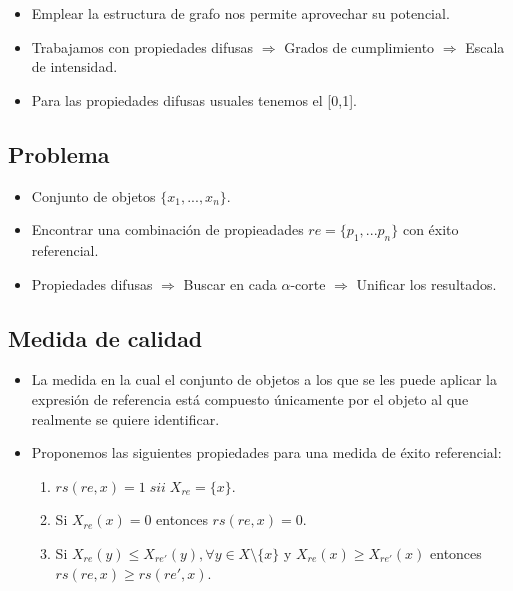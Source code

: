 \documentclass{beamer}
\begin{document}
	\begin{frame}
		\begin{itemize}
			\item Emplear la estructura de grafo nos permite aprovechar su potencial.
			\item Trabajamos con propiedades difusas $\Rightarrow$ Grados de cumplimiento $\Rightarrow$ Escala de intensidad.
			\item Para las propiedades difusas usuales tenemos el [0,1].
		\end{itemize}
	\end{frame}
	
	\subsection{Problema}
	
	\begin{frame}
		\begin{itemize}
			\item Conjunto de objetos $\lbrace x_1, ..., x_n\rbrace$.
			\item Encontrar una combinación de propieadades $re = \lbrace p_1, ... p_n \rbrace$ con éxito referencial.
			\item Propiedades difusas $\Rightarrow$ Buscar en cada $\alpha$-corte $\Rightarrow$ Unificar los resultados.
		\end{itemize}
	\end{frame}
	
	\subsection{Medida de calidad}
	
	\begin{frame}
		\begin{itemize}
			\item La medida en la cual el conjunto de objetos a los que se les puede aplicar la expresión de referencia está compuesto únicamente por el objeto al que realmente se quiere identificar.
			\item Proponemos las siguientes propiedades para una medida de éxito referencial:
				\begin{enumerate}
					\item $rs(re, x) = 1 \; sii \; X_{re} = \lbrace x \rbrace$.
					\item Si $X_{re}(x) = 0$ entonces $rs(re, x) = 0$.
					\item Si $X_{re}(y) \leq X_{re'}(y), \forall y \in X\setminus\lbrace x\rbrace$ y $X_{re}(x) \geq X_{re'}(x)$ entonces $rs(re, x) \geq rs(re', x)$.
				\end{enumerate}
		\end{itemize}
	\end{frame}
	
\end{document}
